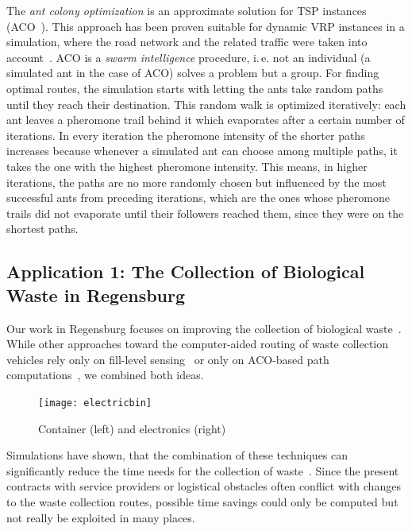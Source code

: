 \documentclass[10pt]{article}
\begin{document}
The {\it ant colony optimization} is an approximate solution for TSP
instances (ACO~\cite{Dorigo97}). This 
approach has been proven suitable for dynamic VRP instances
in a simulation, where the road network and the related 
traffic were taken into account~\cite{Karadimas2008}. ACO is a {\it swarm intelligence}
procedure, i.\,e. not an individual (a simulated ant in the case of 
ACO) solves a problem but a group. For finding optimal routes,
the simulation starts with letting the ants take random paths
until they reach their destination. This random walk is optimized
iteratively: each ant leaves a pheromone trail behind it which
evaporates after a certain number of iterations. In every iteration
the pheromone intensity of the shorter paths increases because
whenever a simulated ant can choose among multiple paths, it takes
the one with the highest pheromone intensity. This means, in higher
iterations, the paths are no more randomly chosen but influenced 
by the most successful ants from preceding iterations, which are
the ones whose pheromone trails did not evaporate until their 
followers reached them, since they were on the shortest paths.


\subsection{Application 1: The Collection of Biological Waste in Regensburg}
\label{sec:Regensburg}

Our work in Regensburg focuses on improving the collection of biological waste~\cite{Burger18}.
While other approaches toward the computer-aided routing of waste collection vehicles 
rely only on fill-level sensing~\cite{LundinOS17} or only on ACO-based path 
computations~\cite{ismail09}, we combined both ideas. 

\begin{figure}[h!]
    \centering
  \texttt{[image: electricbin]}
  \caption{Container (left) and electronics (right)}
  \label{fig:container}       %
\end{figure}

Simulations have shown, that 
the combination of these techniques can significantly reduce the time needs for the collection
of waste~\cite{Sharmin16}. Since the present contracts with service providers or logistical
obstacles often conflict with changes to the waste collection routes, possible time savings could only be computed but not really be exploited in many places.
\end{document}
